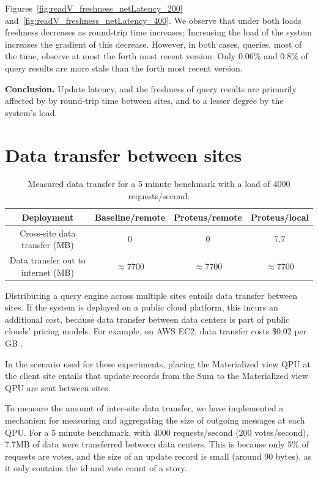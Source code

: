 Figures~\ref{fig:readV_freshness_netLatency_200} and~\ref{fig:readV_freshness_netLatency_400}.
We observe that under both loads freshness decreases as round-trip time increases;
Increasing the load of the system increases the gradient of this decrease.
However, in both cases, queries, most of the time, observe at most the forth most recent version:
Only 0.06\% and 0.8\% of query results are more stale than the forth most recent version.

\medskip
\noindent
\textbf{Conclusion.}
Update latency, and the freshness of query results are primarily affected by
by round-trip time between sites,
and to a lesser degree by the system's load.

\section{Data transfer between sites}
\label{sec:eval_data_transfer}

\begin{table}[H]
\centering
\begin{tabular}{|c||c|c|c||}
\hline
Deployment & Baseline/remote & Proteus/remote & Proteus/local \\
\hline
Cross-site data transfer (MB) & 0 & 0 & 7.7 \\
\hline
Data transfer out to internet (MB) & $\approx$7700 & $\approx$7700 & $\approx$7700 \\
\hline
\end{tabular}
\caption{Measured data transfer for a 5 minute benchmark with a load of 4000 requests/second.}
\label{tab:data_transfer}
\end{table}

Distributing a query engine across multiple sites entails data transfer between sites.
If the system is deployed on a public cloud platform, this incurs an additional cost,
because data transfer between data centers is part of public clouds' pricing models.
For example, on AWS EC2, data transfer costs \$0.02 per GB \cite{aws:pricing}.

In the scenario used for these experiments, placing the Materialized view QPU at the client site entails that
update records from the Sum to the Materialized view QPU are sent between sites.

To measure the amount of inter-site data transfer,
we have implemented a mechanism for measuring and aggregating the size of outgoing messages at each QPU.
For a 5 minute benchmark, with 4000 requests/second (200 votes/second), 7.7MB of data were transferred between data centers.
This is because only 5\% of requests are votes, and the size of an update record is small (around 90 bytes),
as it only contains the id and vote count of a story.

